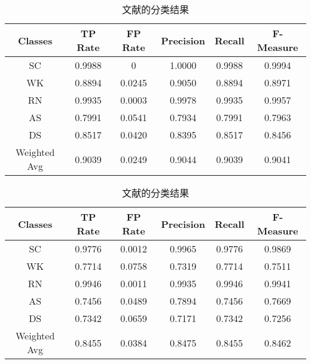  \begin{table}[htb]
    \centering
    \caption{文献的分类结果}
    \begin{tabular}{cccccc}
    \toprule
    Classes & TP Rate & FP Rate & Precision & Recall & F-Measure \\
    \midrule
    SC & 0.9988 & 0 & 1.0000 & 0.9988 & 0.9994 \\
    WK & 0.8894 & 0.0245 & 0.9050 & 0.8894 & 0.8971	\\
    RN & 0.9935 & 0.0003 & 0.9978 & 0.9935 & 0.9957	\\
    AS & 0.7991 & 0.0541 & 0.7934 & 0.7991 & 0.7963 \\
    DS & 0.8517 & 0.0420 & 0.8395 & 0.8517 & 0.8456	\\
    \hline
    Weighted Avg & 0.9039 & 0.0249 & 0.9044 & 0.9039 & 0.9041 \\
    \bottomrule
    \end{tabular}
 \end{table}

  \begin{table}[htb]
    \centering
    \caption{文献的分类结果}
    \begin{tabular}{cccccc}
    \toprule
    Classes & TP Rate & FP Rate & Precision & Recall & F-Measure \\
    \midrule
    SC & 0.9776 & 0.0012 & 0.9965 & 0.9776 & 0.9869 \\
    WK & 0.7714 & 0.0758 & 0.7319 & 0.7714 & 0.7511 \\
    RN & 0.9946 & 0.0011 & 0.9935 & 0.9946 & 0.9941 \\
    AS & 0.7456 & 0.0489 & 0.7894 & 0.7456 & 0.7669 \\
    DS & 0.7342 & 0.0659 & 0.7171 & 0.7342 & 0.7256 \\
    
    Weighted Avg & 0.8455 & 0.0384 & 0.8475 & 0.8455 & 0.8462 \\
    \bottomrule
    \end{tabular}
 \end{table}